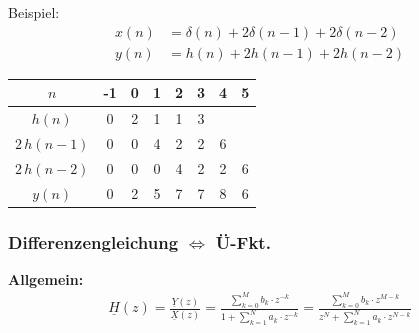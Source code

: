 Beispiel:
\begin{align*}
	x(n)&=\delta(n)+2\delta(n-1)+2\delta(n-2)\\
	y(n)&=h(n)+2h(n-1)+2h(n-2)
\end{align*}

\begin{center}
	\begin{tabular}{|c|c|c|c|c|c|c|c|}
	\hline
	$n$ & -1 & 0 & 1 & 2 & 3 & 4 & 5  \\
	\toprule
	\hline
	$h(n)$ & 0 & 2 & 1 & 1 & 3 &  &  \\
	\hline
	$2\,h(n-1)$ & 0 & 0 & 4 & 2 & 2 & 6 & \\
	\hline
	$2\,h(n-2)$ & 0 & 0 & 0 & 4 & 2 & 2 & 6\\
	\hline
	\bottomrule
	$y(n)$ & 0 & 2 & 5 & 7 & 7 & 8  & 6 \\
	\hline
\end{tabular}
\end{center}
\subsubsection{Differenzengleichung $\Leftrightarrow$ Ü-Fkt.}
\textbf{Allgemein:}
\begin{gather*}
	\underline{H}(z)=\frac{\underline{Y}(z)}{\underline{X}(z)}=\frac{\sum_{k=0}^{M} b_{k} \cdot z^{-k}}{1+\sum_{k=1}^{N} a_{k} \cdot z^{-k}}=\frac{\sum_{k=0}^{M} b_{k} \cdot z^{M-k}}{z^{N}+\sum_{k=1}^{N} a_{k} \cdot z^{N-k}}
\end{gather*}

